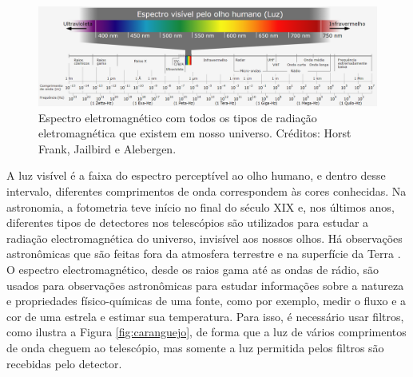  \begin{figure}[h]
   \centering 
   \includegraphics[width=1.0\textwidth]{Imagens/espectro.PNG} 
   \caption[Espectro eletromagnético.]{Espectro eletromagnético com todos os tipos de radiação eletromagnética que existem em nosso universo. Créditos: Horst Frank, Jailbird e Alebergen.}
   \label{fig:espectro} 
 \end{figure}
 
A luz visível é a faixa do espectro perceptível ao olho humano, e dentro desse intervalo, diferentes comprimentos de onda correspondem às cores conhecidas. Na astronomia, a fotometria teve início no final do século XIX e, nos últimos anos, diferentes tipos de detectores nos telescópios são utilizados para estudar a radiação electromagnética do universo, invisível aos nossos olhos. Há observações astronômicas que são feitas fora da atmosfera terrestre e na superfície da Terra \cite{2023Kepler}. O espectro electromagnético, desde os raios gama até as ondas de rádio, são usados para observações astronômicas para estudar informações sobre a natureza e propriedades físico-químicas de uma fonte, como por exemplo, medir o fluxo e a cor de uma estrela e estimar sua temperatura. Para isso, é necessário usar filtros, como ilustra a Figura \ref{fig:caranguejo}, de forma que a luz de vários comprimentos de onda cheguem ao telescópio, mas somente a luz permitida pelos filtros são recebidas pelo detector.
 

